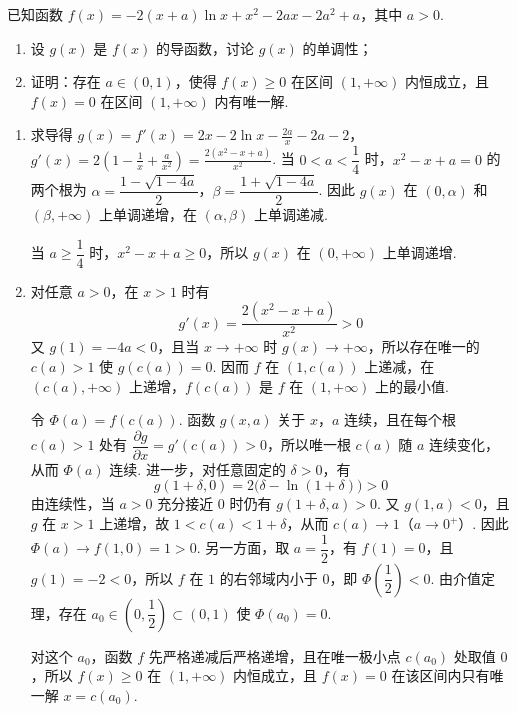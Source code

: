 \begin{problem}
已知函数 \( f(x) = -2(x + a)\ln x + x^2 - 2ax - 2a^2 + a \)，其中 \( a > 0 \).
\begin{enumerate}
\item 设 \(g(x)\) 是 \(f(x)\) 的导函数，讨论 \(g(x)\) 的单调性；
\item 证明：存在 \(a \in (0,1)\)，使得 \(f(x) \geqslant 0\) 在区间 \((1, +\infty)\) 内恒成立，且 \(f(x) = 0\) 在区间 \((1, +\infty)\) 内有唯一解.
\end{enumerate}
\begin{solution}
\begin{enumerate}
\item 求导得
\(g(x)=f'(x)=2x-2\ln x-\frac{2a}{x}-2a-2\)，\(g'(x)=2\left(1-\frac1x+\frac a{x^2}\right)=\frac{2(x^2-x+a)}{x^2}\).
当 \(0<a<\dfrac14\) 时，\(x^2-x+a=0\) 的两个根为
\(\alpha=\dfrac{1-\sqrt{1-4a}}2\)，\(\beta=\dfrac{1+\sqrt{1-4a}}2\). 因此 \(g(x)\) 在 \((0,\alpha)\) 和 \((\beta,+\infty)\) 上单调递增，在 \((\alpha,\beta)\) 上单调递减.

当 \(a\geqslant\dfrac14\) 时，\(x^2-x+a\geqslant0\)，所以 \(g(x)\) 在 \((0,+\infty)\) 上单调递增.
\item 对任意 \(a>0\)，在 \(x>1\) 时有
\[
g'(x)=\frac{2(x^2-x+a)}{x^2}>0
\]
又 \(g(1)=-4a<0\)，且当 \(x\to+\infty\) 时 \(g(x)\to+\infty\)，所以存在唯一的 \(c(a)>1\) 使 \(g(c(a))=0\). 因而 \(f\) 在 \((1,c(a))\) 上递减，在 \((c(a),+\infty)\) 上递增，\(f(c(a))\) 是 \(f\) 在 \((1,+\infty)\) 上的最小值.

令 \(\Phi(a)=f(c(a))\). 函数 \(g(x,a)\) 关于 \(x\)，\(a\) 连续，且在每个根 \(c(a)>1\) 处有 \(\dfrac{\partial g}{\partial x}=g'(c(a))>0\)，所以唯一根 \(c(a)\) 随 \(a\) 连续变化，从而 \(\Phi(a)\) 连续. 进一步，对任意固定的 \(\delta>0\)，有
\[
g(1+\delta,0)=2\bigl(\delta-\ln(1+\delta)\bigr)>0
\]
由连续性，当 \(a>0\) 充分接近 \(0\) 时仍有 \(g(1+\delta,a)>0\). 又 \(g(1,a)<0\)，且 \(g\) 在 \(x>1\) 上递增，故 \(1<c(a)<1+\delta\)，从而 \(c(a)\to1\)（\(a\to0^+\)）. 因此 \(\Phi(a)\to f(1,0)=1>0\). 另一方面，取 \(a=\dfrac12\)，有 \(f(1)=0\)，且 \(g(1)=-2<0\)，所以 \(f\) 在 \(1\) 的右邻域内小于 \(0\)，即 \(\Phi\left(\dfrac12\right)<0\). 由介值定理，存在 \(a_0\in\left(0,\dfrac12\right)\subset(0,1)\) 使 \(\Phi(a_0)=0\).

对这个 \(a_0\)，函数 \(f\) 先严格递减后严格递增，且在唯一极小点 \(c(a_0)\) 处取值 \(0\)，所以 \(f(x)\geqslant0\) 在 \((1,+\infty)\) 内恒成立，且 \(f(x)=0\) 在该区间内只有唯一解 \(x=c(a_0)\).
\end{enumerate}
\end{solution}
\end{problem}
